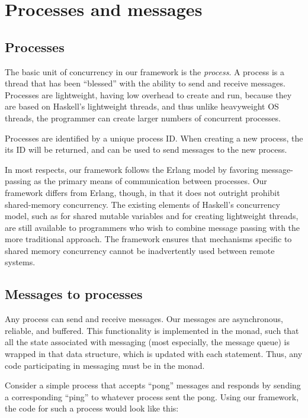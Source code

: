 \documentclass[preprint]{sigplanconf}
\begin{document}
\section{Processes and messages}

\subsection{Processes}
The basic unit of concurrency in our framework is the {\em process}. A process is a thread that has been ``blessed'' with the ability to send and receive messages. Processes are lightweight, having low overhead to create and run, because they are based on Haskell's  lightweight threads, and thus unlike heavyweight OS threads, the programmer can create larger numbers of concurrent processes.

Processes are identified by a unique process ID. When creating a new process, the its ID will be returned, and can be used to send messages to the new process.

In most respects, our framework follows the Erlang model by favoring message-passing as the primary means of communication between processes. Our framework differs from Erlang, though, in that it does not outright prohibit shared-memory concurrency. The existing elements of Haskell's concurrency model, such as  for shared mutable variables and  for creating lightweight threads, are still available to programmers who wish to combine message passing with the more traditional approach. The framework ensures that mechanisms specific to shared memory concurrency cannot be inadvertently used between remote systems. 

\subsection{Messages to processes}

Any process can send and receive messages. Our messages are asynchronous, reliable, and buffered. This functionality is implemented in the  monad, such that all the state associated with messaging (most especially, the message queue) is wrapped in that data structure, which is updated with each statement. Thus, any code participating in messaging must be in the  monad.

Consider a simple process that accepts ``pong'' messages and responds by sending a corresponding ``ping'' to whatever process sent the pong. Using our framework, the code for such a process would look like this:
\end{document}
